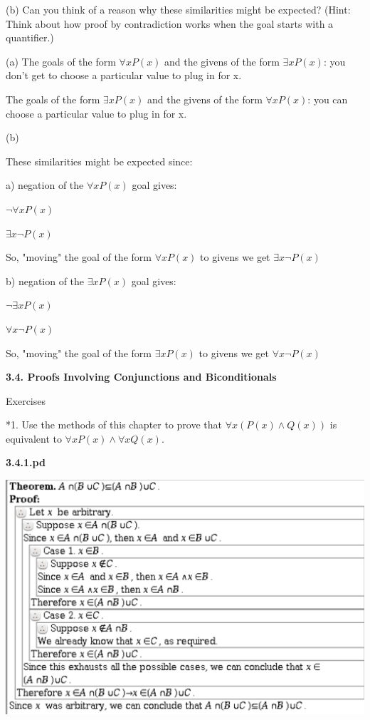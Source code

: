 \documentclass{article}
\begin{document}
\hspace{12pt}(b) Can you think of a reason why these similarities might be expected?
(Hint: Think about how proof by contradiction works when the goal
starts with a quantifier.)
\vspace{30pt}

(a) The goals of the form $\forall x P(x)$ and the givens of the form $\exists x P(x)$:
you don't get to choose a particular value to plug in for x.

The goals of the form $\exists x P(x)$ and the givens of the form $\forall x P(x)$:
you can choose a particular value to plug in for x.

\vspace{20pt}

(b)

These similarities might be expected since:

a) negation of the $\forall x P(x)$ goal gives:

$\neg \forall x P(x)$

$\exists x \neg P(x)$

So, "moving" the goal of the form $\forall x P(x)$ to givens we get $\exists x \neg P(x)$

\vspace{10pt}
b) negation of the $\exists x P(x)$ goal gives:

$\neg \exists x P(x)$

$\forall x \neg P(x)$

So, "moving" the goal of the form $\exists x P(x)$ to givens we get $\forall x \neg P(x)$

\vspace{50pt}

\textbf{3.4. Proofs Involving Conjunctions and Biconditionals}

Exercises
\vspace{30pt}

*1. Use the methods of this chapter to prove that $\forall x(P(x) \land Q(x))$ is
equivalent to $\forall x P(x) \land \forall x Q(x)$.
\vspace{30pt}

\textbf{3.4.1.pd}
\vspace{10pt}

\includegraphics[width=\textwidth]{3_4_1}
\end{document}
